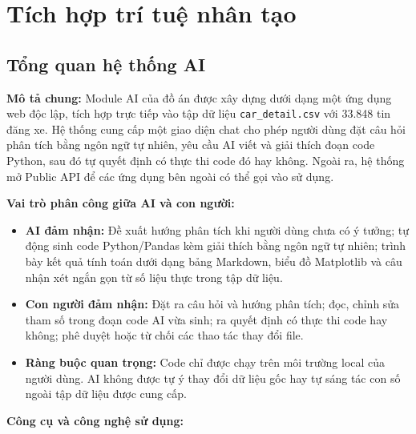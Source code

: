 \section{Tích hợp trí tuệ nhân tạo}
\label{sec:ai_integration}

\subsection{Tổng quan hệ thống AI}
\label{subsec:ai_overview}

\noindent\textbf{Mô tả chung:}
Module AI của đồ án được xây dựng dưới dạng một ứng dụng web độc lập, tích hợp trực tiếp vào tập dữ liệu \texttt{car\_detail.csv} với 33.848 tin đăng xe. Hệ thống cung cấp một giao diện chat cho phép người dùng đặt câu hỏi phân tích bằng ngôn ngữ tự nhiên, yêu cầu AI viết và giải thích đoạn code Python, sau đó tự quyết định có thực thi code đó hay không. Ngoài ra, hệ thống mở Public API để các ứng dụng bên ngoài có thể gọi vào sử dụng.

\noindent\textbf{Vai trò phân công giữa AI và con người:}
\begin{itemize}
    \item \textbf{AI đảm nhận:} Đề xuất hướng phân tích khi người dùng chưa có ý tưởng; tự động sinh code Python/Pandas kèm giải thích bằng ngôn ngữ tự nhiên; trình bày kết quả tính toán dưới dạng bảng Markdown, biểu đồ Matplotlib và câu nhận xét ngắn gọn từ số liệu thực trong tập dữ liệu.
    \item \textbf{Con người đảm nhận:} Đặt ra câu hỏi và hướng phân tích; đọc, chỉnh sửa tham số trong đoạn code AI vừa sinh; ra quyết định có thực thi code hay không; phê duyệt hoặc từ chối các thao tác thay đổi file.
    \item \textbf{Ràng buộc quan trọng:} Code chỉ được chạy trên môi trường local của người dùng. AI không được tự ý thay đổi dữ liệu gốc hay tự sáng tác con số ngoài tập dữ liệu được cung cấp.
\end{itemize}

\noindent\textbf{Công cụ và công nghệ sử dụng:}


